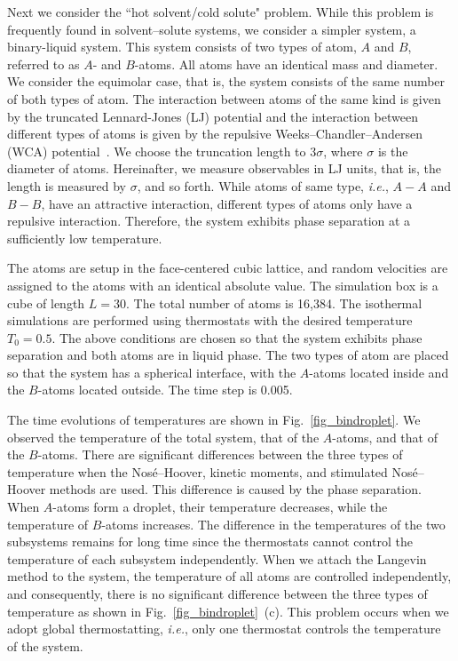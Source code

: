 \documentclass[pre,twocolumn]{revtex4}
\begin{document}
Next we consider the ``hot solvent/cold solute" problem.
While this problem is frequently found in solvent--solute systems, 
we consider a simpler system, a binary-liquid system.
This system consists of two types of atom, $A$ and $B$, referred to as $A$- and $B$-atoms.
All atoms have an identical mass and diameter.
We consider the equimolar case, that is, the system consists of 
the same number of both types of atom.
The interaction between atoms of the same kind is given by the truncated Lennard-Jones (LJ) potential
and the interaction between different types of atoms is given by the repulsive Weeks--Chandler--Andersen (WCA) potential~\cite{Weeks_1971}.
We choose the truncation length to $3 \sigma$, where $\sigma$ is the diameter of atoms.
Hereinafter, we measure observables in LJ units, that is, the length is measured by $\sigma$, and so forth.
While atoms of same type, \textit{i.e.}, $A-A$ and $B-B$, have an attractive interaction,
different types of atoms only have a repulsive interaction.
Therefore, the system exhibits phase separation at a sufficiently low temperature.

The atoms are setup in the face-centered cubic lattice, and random velocities are assigned to the atoms with an identical absolute value.
The simulation box is a cube of length $L=30$.
The total number of atoms is 16,384.
The isothermal simulations are performed using thermostats with the desired temperature $T_0 = 0.5$.
The above conditions are chosen so that the system exhibits phase separation
and both atoms are in liquid phase.
The two types of atom are placed so that the system has a spherical interface,
with the $A$-atoms located inside and the $B$-atoms located outside.
The time step is 0.005.

The time evolutions of temperatures are shown in Fig.~\ref{fig_bindroplet}.
We observed the temperature of the total system,
that of the $A$-atoms, and that of the $B$-atoms.
There are significant differences between the three types of temperature when 
the Nos\'e--Hoover, kinetic moments, and stimulated Nos\'e--Hoover methods are used.
This difference is caused by the phase separation.
When $A$-atoms form a droplet, their temperature decreases,
while the temperature of $B$-atoms increases.
The difference in the temperatures of the two subsystems remains for long time
since the thermostats cannot control the temperature of each subsystem independently.
When we attach the Langevin method to the system, the temperature of all atoms are controlled independently,
and consequently, there is no significant difference between the three types of temperature as shown in Fig.~\ref{fig_bindroplet}~(c).
This problem occurs when we adopt global thermostatting, \textit{i.e.}, only one thermostat 
controls the temperature of the system. 
\end{document}
